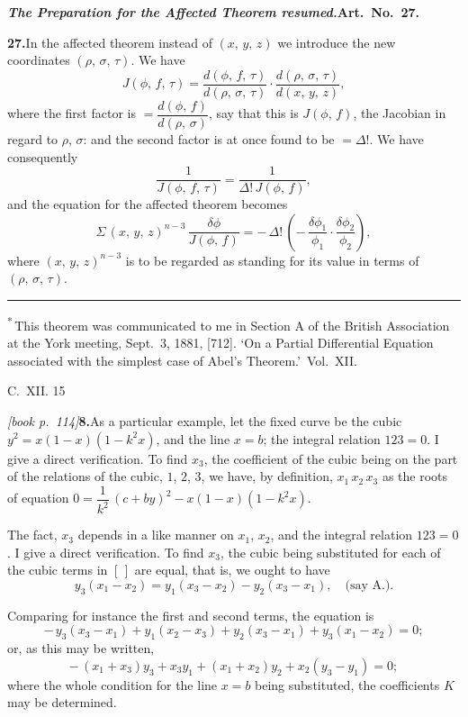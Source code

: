 \documentclass[11pt,a4paper]{article}
\theoremstyle{plain}
\theoremstyle{definition}
\theoremstyle{remark}
\begin{document}
\medskip\noindent\textbf{\textit{The Preparation for the Affected Theorem resumed.}\quad Art.\ No.~27.}

\medskip\noindent\textbf{27.}\quad In the affected theorem instead of $(x,\,y,\,z)$ we introduce the new coordinates $(\rho,\,\sigma,\,\tau)$. We have
\[
J(\phi,\,f,\,\tau) = \frac{d(\phi,\,f,\,\tau)}{d(\rho,\,\sigma,\,\tau)}\cdot\frac{d(\rho,\,\sigma,\,\tau)}{d(x,\,y,\,z)},
\]
where the first factor is $= \dfrac{d(\phi,\,f)}{d(\rho,\,\sigma)}$, say that this is $J(\phi,\,f)$, the Jacobian in regard to $\rho$, $\sigma$: and the second factor is at once found to be $= \Delta!$. We have consequently
\[
\frac{1}{J(\phi,\,f,\,\tau)} = \frac{1}{\Delta!\,J(\phi,\,f)},
\]
and the equation for the affected theorem becomes
\[
\Sigma\,(x,\,y,\,z)^{n-3}\,\frac{\delta\phi}{J(\phi,\,f)} = -\,\Delta!\,\left(-\,\frac{\delta\phi_1}{\phi_1}\cdot\frac{\delta\phi_2}{\phi_2}\right),
\]
where $(x,\,y,\,z)^{n-3}$ is to be regarded as standing for its value in terms of $(\rho,\,\sigma,\,\tau)$.

\bigskip

\hrule
\smallskip
\noindent\textsuperscript{*}\,This theorem was communicated to me in Section A of the British Association at the York meeting, Sept.~3, 1881, [712]. `On a Partial Differential Equation associated with the simplest case of Abel's Theorem.'\ Vol.~XII.

C.~XII. \hfill 15

\noindent\textit{[book p.~114]}\quad \textbf{8.}\quad As a particular example, let the fixed curve be the cubic $y^2 = x(1 - x)(1 - k^2 x)$, and the line $x = b$; the integral relation $123 = 0$. I give a direct verification. To find $x_3$, the coefficient of the cubic being on the part of the relations of the cubic, $1$, $2$, $3$, we have, by definition, ${x_1\,x_2\,x_3}$ as the roots of equation $0 = \dfrac{1}{k^2}\,(c + by)^2 - x(1 - x)(1 - k^2 x)$.

The fact, $x_3$ depends in a like manner on $x_1$, $x_2$, and the integral relation $123 = 0$. I give a direct verification. To find $x_3$, the cubic being substituted for each of the cubic terms in $[\,]$ are equal, that is, we ought to have
\[
y_3(x_1 - x_2) = y_1(x_3 - x_2) - y_2(x_3 - x_1),\quad \text{(say A.).}
\]

Comparing for instance the first and second terms, the equation is
\[
-\,y_3(x_3 - x_1) + y_1(x_2 - x_3) + y_2(x_3 - x_1) + y_3(x_1 - x_2) = 0;
\]
or, as this may be written,
\[
-\,(x_1 + x_3)y_3 + x_3y_1 + (x_1 + x_2)y_2 + x_2(y_3 - y_1) = 0;
\]
where the whole condition for the line $x = b$ being substituted, the coefficients $K$ may be determined.
\end{document}
